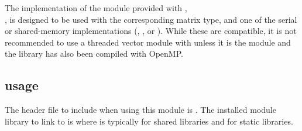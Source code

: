 
The {\superlumt} implementation of the {\sunlinsol} module provided with
{\sundials},\\
\noindent{\sunlinsolslumt}, is designed to be used with the
corresponding {\sunmatsparse} matrix type, and one of the serial or
shared-memory {\nvector} implementations ({\nvecs}, {\nvecopenmp}, or 
{\nvecpthreads}).  While these are compatible, it is not recommended
to use a threaded vector module with {\sunlinsolslumt} unless it is
the {\nvecopenmp} module and the {\superlumt} library has also been
compiled with OpenMP.

\subsection{{\sunlinsolslumt} usage}\label{ss:sunlinsol_slumt_usage}

The header file to include when using this module 
is . The installed module
library to link to is
where  is typically  for shared libraries and
 for static libraries.


